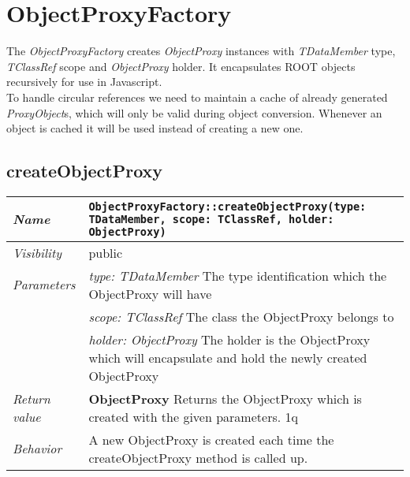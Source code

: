 \chapter{ObjectProxyFactory}
The \textit{ObjectProxyFactory} creates \textit{ObjectProxy} instances with \textit{TDataMember} type, \textit{TClassRef} scope and \textit{ObjectProxy} holder. It encapsulates ROOT objects recursively for use in Javascript.\\

To handle circular references we need to maintain a cache of already generated \textit{ProxyObject}s, which will only be valid during object conversion. Whenever an object is cached it will be used instead of creating a new one.
\section{createObjectProxy}
\begin{longtable}{p{3cm} @{\hskip 1cm} p{12cm}}
 \hline
\textit{Name} & \texttt{ObjectProxyFactory::createObjectProxy(type: TDataMember, scope: TClassRef, holder: ObjectProxy)}\\
\hline
 \textit{Visibility} & public\\
\hline
\textit{Parameters} & \textit{type: TDataMember} The type identification which the ObjectProxy will have \\
& \textit{scope: TClassRef} The class the ObjectProxy belongs to \\
& \textit{holder: ObjectProxy}  The holder is the ObjectProxy which will encapsulate and hold the newly created ObjectProxy \\
\hline
\textit{Return value} & \textbf{ObjectProxy} Returns the ObjectProxy which is created with the given parameters. 1q\\
  \hline
 \textit{Behavior} & A new ObjectProxy is created each time the createObjectProxy method is called up. \\
\hline
\end{longtable} \pagebreak
